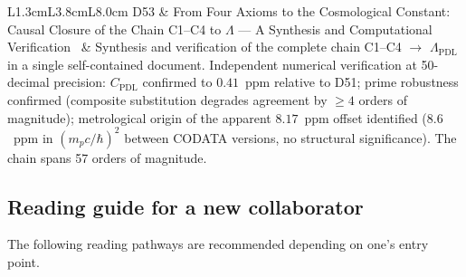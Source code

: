 \documentclass[11pt,a4paper]{article}
\theoremstyle{plain}
\theoremstyle{definition}
\theoremstyle{remark}
\begin{document}
\begin{longtable}{L{1.3cm}L{3.8cm}L{8.0cm}}
D53 & From Four Axioms to the Cosmological Constant: Causal Closure of the Chain C1--C4 to $\Lambda$ --- A Synthesis and Computational Verification~\cite{D53} & \textcolor{proofblue}{Synthesis and verification} of the complete chain C1--C4 $\to$ $\Lambda_{\mathrm{PDL}}$ in a single self-contained document. Independent numerical verification at 50-decimal precision: $C_{\mathrm{PDL}}$ confirmed to $0.41$~ppm relative to D51; prime robustness confirmed (composite substitution degrades agreement by $\geq 4$ orders of magnitude); metrological origin of the apparent $8.17$~ppm offset identified ($8.6$~ppm in $(m_p c/\hbar)^2$ between CODATA versions, no structural significance). The chain spans 57 orders of magnitude.\\[0.4em]
\end{longtable}

\subsection{Reading guide for a new collaborator}
\label{subsec:readingguide}
The following reading pathways are recommended depending on one's entry point.
\end{document}
